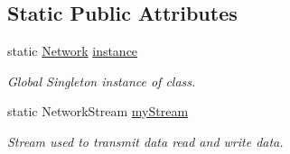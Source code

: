 \subsection*{Static Public Attributes}
\begin{DoxyCompactItemize}
\item 
static \mbox{\hyperlink{class_network}{Network}} \mbox{\hyperlink{class_network_af63d25c25873f9220c94d6250a1c9242}{instance}}
\begin{DoxyCompactList}\small\item\em Global Singleton instance of class. \end{DoxyCompactList}\item 
static Network\+Stream \mbox{\hyperlink{class_network_ac9848301f17c819897dc89fce29b8e6a}{my\+Stream}}
\begin{DoxyCompactList}\small\item\em Stream used to transmit data read and write data. \end{DoxyCompactList}\end{DoxyCompactItemize}
